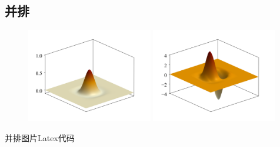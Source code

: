 \documentclass[engineeringmaster]{hquThesis}
\begin{document}
\subsection*{并排}
\begin{figure}[H]
    \centering
    \begin{subcaptiongroup}
    \includegraphics[width=0.49\textwidth]{figures/1.png}
    \label{1}
    \includegraphics[width=0.49\textwidth]{figures/2.png}
    \label{2}
    \end{subcaptiongroup}
\caption{}
\label{CHGraphsettings_fig2_meshfree}
\end{figure}
并排图片Latex代码
\end{document}
